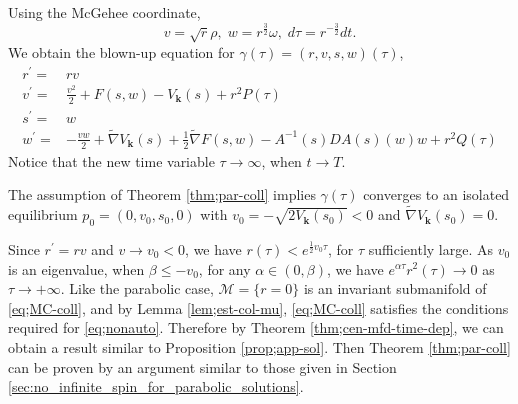 \documentclass[11pt]{amsart}
\theoremstyle{definition}
\theoremstyle{remark}
\numberwithin{equation}{section}
\newcommand{\al}{\alpha}
\newcommand{\gm}{\gamma}
\newcommand{\bk}{\mathbf k}
\begin{document}
Using the McGehee coordinate, 
$$ v=\sqrt{r}\rho, \; w=r^{\frac{3}{2}}\omega, \; d\tau =r^{-\frac{3}{2}} dt. $$
We obtain the blown-up equation for $\gm(\tau) = (r, v, s, w)(\tau)$, 
\begin{equation} \label{eq;MC-coll}
    \begin{aligned}
        r^\prime=&rv\\
        v^\prime=&\frac{v^2}{2}+F(s,w)-V_{\mathbf{k}}(s)+r^2P(\tau)\\
        s^\prime=&w\\
        w^\prime=&-\frac{vw}{2}+\tilde{\nabla}V_{\mathbf{k}}(s)+\frac{1}{2}\tilde{\nabla}F(s,w)-A^{-1}(s)DA(s)(w)w+r^2Q(\tau)
    \end{aligned}
\end{equation}
Notice that the new time variable $\tau \to \infty$, when $t \to T$. 


The assumption of Theorem \ref{thm;par-coll} implies $\gm(\tau)$ converges to an isolated equilibrium $p_0 =(0, v_0, s_0, 0)$ with $v_0 = -\sqrt{2V_{\bk}(s_0)} <0$ and $\tilde{\nabla}V_{\bk}(s_0)=0$.

Since $r^\prime=rv$ and $v\to v_0<0$, we have $r(\tau)<e^{\frac{1}{2}v_0\tau}$, for $\tau$ sufficiently large. As $v_0$ is an eigenvalue, when $\beta\le -v_0$, for any $\al\in(0,\beta)$, we have $e^{\al \tau}r^2(\tau)\rightarrow 0$ as $\tau\rightarrow+\infty$.  Like the parabolic case, $\mathcal M=\{ r =0\}$ is an invariant submanifold of \eqref{eq;MC-coll}, and by Lemma \ref{lem;est-col-mu}, \eqref{eq;MC-coll} satisfies the conditions required for \eqref{eq;nonauto}. Therefore by Theorem \ref{thm;cen-mfd-time-dep}, we can obtain a result similar to Proposition \ref{prop;app-sol}. Then Theorem \ref{thm;par-coll} can be proven by an argument similar to those given in Section \ref{sec:no_infinite_spin_for_parabolic_solutions}.  




\end{document}

